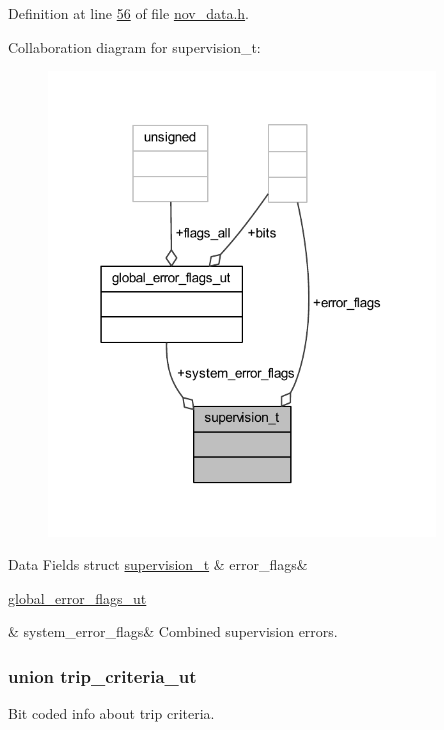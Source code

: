 Definition at line \hyperlink{a00022_source_l00056}{56} of file \hyperlink{a00022_source}{nov\+\_\+data.\+h}.



Collaboration diagram for supervision\+\_\+t\+:\nopagebreak
\begin{figure}[H]
\begin{center}
\leavevmode
\includegraphics[width=291pt]{d0/d85/a00976}
\end{center}
\end{figure}
\begin{DoxyFields}{Data Fields}
\hypertarget{a00022_abc1a03c9fc69d3db5c3c13d8cba594f4}{struct \hyperlink{a00022_d4/d45/a00791}{supervision\+\_\+t}}\label{a00022_abc1a03c9fc69d3db5c3c13d8cba594f4}
&
error\+\_\+flags&
\\
\hline

\hypertarget{a00022_af01cfb308e496b8084778ac0315c9ccc}{\hyperlink{a00022_d1/d0b/a00452}{global\+\_\+error\+\_\+flags\+\_\+ut}}\label{a00022_af01cfb308e496b8084778ac0315c9ccc}
&
system\+\_\+error\+\_\+flags&
Combined supervision errors. \\
\hline

\end{DoxyFields}
\label{d8/d64/a00828}
\hypertarget{a00022_d8/d64/a00828}{}
\subsubsection{union trip\+\_\+criteria\+\_\+ut}
Bit coded info about trip criteria. 


